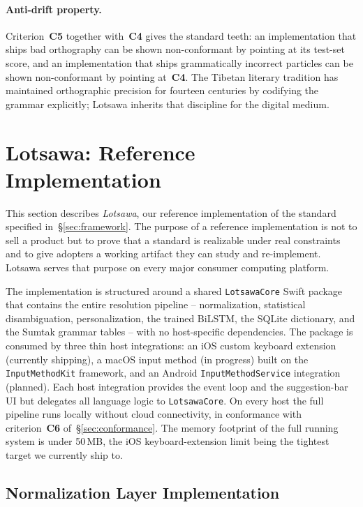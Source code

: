 \documentclass[11pt]{article}
\begin{document}
\paragraph{Anti-drift property.} Criterion~\textbf{C5} together with~\textbf{C4} gives the standard teeth: an implementation that ships bad orthography can be shown non-conformant by pointing at its test-set score, and an implementation that ships grammatically incorrect particles can be shown non-conformant by pointing at~\textbf{C4}. The Tibetan literary tradition has maintained orthographic precision for fourteen centuries by codifying the grammar explicitly; Lotsawa inherits that discipline for the digital medium.

\section{Lotsawa: Reference Implementation}
\label{sec:arch}

This section describes \emph{Lotsawa}, our reference implementation of the standard specified in~\S\ref{sec:framework}. The purpose of a reference implementation is not to sell a product but to prove that a standard is realizable under real constraints and to give adopters a working artifact they can study and re-implement. Lotsawa serves that purpose on every major consumer computing platform.

The implementation is structured around a shared \texttt{LotsawaCore} Swift package that contains the entire resolution pipeline -- normalization, statistical disambiguation, personalization, the trained BiLSTM, the SQLite dictionary, and the Sumtak grammar tables -- with no host-specific dependencies. The package is consumed by three thin host integrations: an iOS custom keyboard extension (currently shipping), a macOS input method (in progress) built on the \texttt{InputMethodKit} framework, and an Android \texttt{InputMethodService} integration (planned). Each host integration provides the event loop and the suggestion-bar UI but delegates all language logic to \texttt{LotsawaCore}. On every host the full pipeline runs locally without cloud connectivity, in conformance with criterion~\textbf{C6} of~\S\ref{sec:conformance}. The memory footprint of the full running system is under 50\,MB, the iOS keyboard-extension limit being the tightest target we currently ship to.

\subsection{Normalization Layer Implementation}
\label{sec:arch-normalization}
\end{document}
